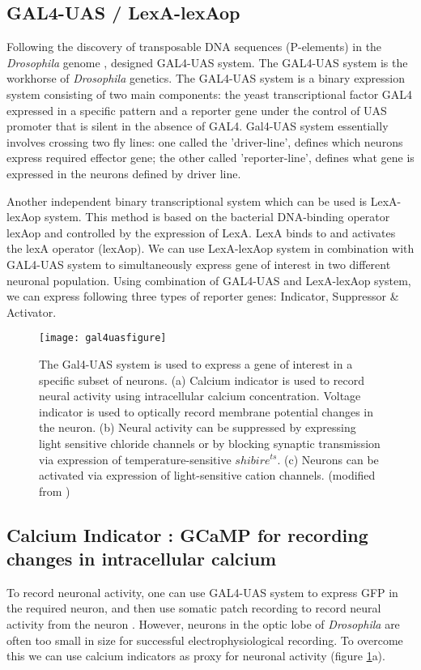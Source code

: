 \subsection{GAL4-UAS / LexA-lexAop}
Following the discovery of transposable DNA sequences (P-elements) in the \textit{Drosophila} genome \parencite{Rubin1982}, \cite{Brand1993} designed GAL4-UAS system. The GAL4-UAS system is the workhorse of \textit{Drosophila} genetics. The GAL4-UAS system is a binary expression system consisting of two main components: the yeast transcriptional factor GAL4 expressed in a specific pattern and a reporter gene under the control of UAS promoter that is silent in the absence of GAL4. Gal4-UAS system essentially involves crossing two fly lines: one called the 'driver-line', defines which neurons express required effector gene; the other called 'reporter-line', defines what gene is expressed in the neurons defined by driver line. 

Another independent binary transcriptional system which can be used is LexA-lexAop system. This method is based on the bacterial DNA-binding operator lexAop and controlled by the expression of LexA. LexA binds to and activates the lexA operator (lexAop). We can use LexA-lexAop system in combination with GAL4-UAS system to simultaneously express gene of interest in two different neuronal population. Using combination of GAL4-UAS and LexA-lexAop system, we can express following three types of reporter genes: Indicator, Suppressor \& Activator.
\begin{figure}
\centering
\hspace*{-1cm} 
\texttt{[image: gal4uasfigure]}
\caption[Genetic tools for functional manipulations in \textit{Drosophila}] {The Gal4-UAS system is used to express a gene of interest in a specific subset of neurons. (a) Calcium indicator is used to record neural activity using intracellular calcium concentration. Voltage indicator is used to optically record membrane potential changes in the neuron. (b) Neural activity can be suppressed by expressing light sensitive chloride channels or by blocking synaptic transmission via expression of temperature-sensitive $shibire^{ts}$. (c) Neurons can be activated via expression of light-sensitive cation channels. (modified from \cite{Borst2009})}
\label{fig:gal4uas}
\end{figure}
\subsection{Calcium Indicator : GCaMP for recording changes in intracellular calcium}
To record neuronal activity, one can use GAL4-UAS system to express GFP in the required neuron, and then use somatic patch recording to record neural activity from the neuron \parencite{Wilson2004, Joesch2008}. However, neurons in the optic lobe of \textit{Drosophila} are often too small in size for successful electrophysiological recording. To overcome this we can use calcium indicators as proxy for neuronal activity (figure  \ref{fig:gal4uas}a). 

